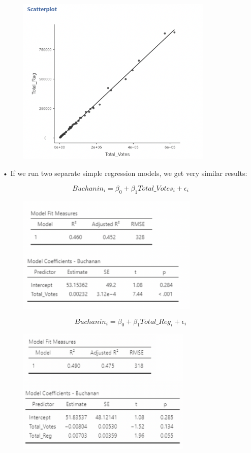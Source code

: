 \documentclass[
  letterpaper,
  DIV=11,
  numbers=noendperiod]{scrreprt}
\begin{document}
\begin{figure}

{\centering \includegraphics[width=3.69792in,height=\textheight]{images/mod4_pt1_24.png}

}

\end{figure}

• If we run two separate simple regression models, we get very similar
results:

\[
Buchanin_i = \beta_0 + \beta_1Total\_Votes_i + \epsilon_i
\]

\begin{figure}

\includegraphics[width=3.41667in,height=\textheight]{images/mod4_pt1_25.png} \hfill{}

\end{figure}

\[
Buchanin_i = \beta_0 + \beta_1Total\_Reg_i + \epsilon_i
\]

\begin{figure}

\includegraphics[width=3.28125in,height=\textheight]{images/mod4_pt1_27.png} \hfill{}

\end{figure}
\end{document}
